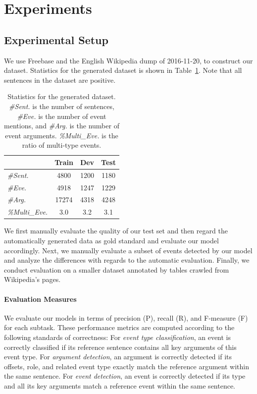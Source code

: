 \section{Experiments}
\subsection{Experimental Setup}
We use Freebase and the English Wikipedia dump of 2016-11-20, to construct our dataset. Statistics for the generated dataset is shown in Table~\ref{statistics}. Note that all sentences in the dataset are positive. 
\begin{table}
\small
\centering
\begin{tabular}{|l|c|c|c|} \hline
& Train & Dev & Test \\ \hline
\emph{\#Sent.} & 4800 & 1200 & 1180 \\ \hline
\emph{\#Eve.} & 4918 & 1247 & 1229 \\ \hline
\emph{\#Arg.} & 17274 & 4318 & 4248 \\ \hline
\emph{\%Multi\_Eve.} & 3.0 & 3.2 & 3.1 \\ \hline
\end{tabular}	
\caption{Statistics for the generated dataset. \emph{\#Sent.} is the number of sentences, \emph{\#Eve.} is the number of event mentions, and \emph{\#Arg.} is the number of event arguments. \emph{\%Multi\_Eve.} is the ratio of multi-type events.
\label{statistics}}
\end{table}
We first manually evaluate the quality of our test set and then regard the automatically generated data as gold standard and evaluate our model accordingly. Next, we manually evaluate a subset of events detected by our model and analyze the differences with regards to the automatic evaluation. Finally, we conduct evaluation on a smaller dataset annotated by tables crawled from Wikipedia's pages. 

\paragraph{Evaluation Measures} We evaluate our models in terms of precision (P), recall (R), and F-measure (F) for each subtask. These performance metrics are computed according to the following standards of correctness: 
For \emph{event type classification}, an event is correctly classified if its reference sentence contains all key arguments of this event type. 
For \emph{argument detection}, an argument is correctly detected if its offsets, role, and related event type exactly match the reference argument within the same sentence. 
For \emph{event detection}, an event is correctly detected if its type and all its key arguments match a reference event within the same sentence.

